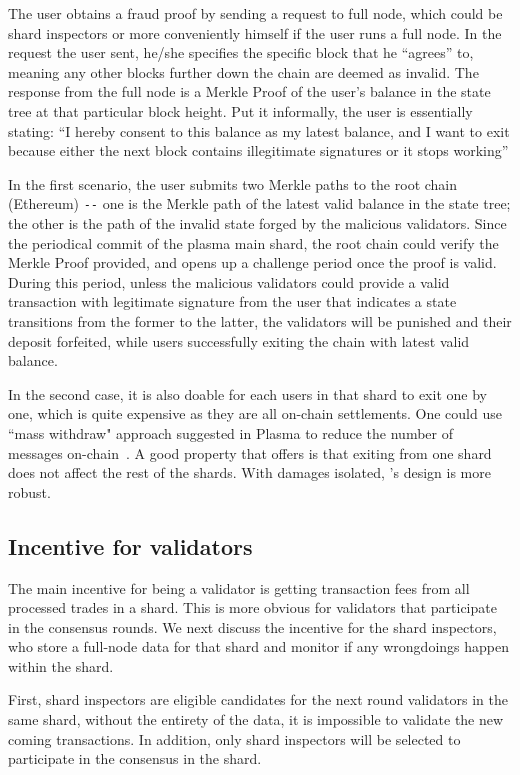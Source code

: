 The user obtains a fraud proof by sending a request to full node, which could be shard inspectors or more conveniently himself if the user runs a full node. In the request the user sent, he/she specifies the specific block that he “agrees” to, meaning any other blocks further down the chain are deemed as invalid. The response from the full node is a Merkle Proof of the user’s balance in the state tree at that particular block height. Put it informally, the user is essentially stating: “I hereby consent to this balance as my latest balance, and I want to exit because either the next block contains illegitimate signatures or it stops working”

In the first scenario, the user submits two Merkle paths to the root chain (Ethereum) \texttt{-{}-} one is the Merkle path of the latest valid balance in the state tree; the other is the path of the invalid state forged by the malicious validators. Since the periodical commit of the plasma main shard, the root chain could verify the Merkle Proof provided, and opens up a challenge period once the proof is valid. During this period, unless the malicious validators could provide a valid transaction with legitimate signature from the user that indicates a state transitions from the former to the latter, the validators will be punished and their deposit forfeited, while users successfully exiting the chain with latest valid balance.

In the second case, it is also doable for each users in that shard to exit one by one, which is quite expensive as they are all on-chain settlements. One could use ``mass withdraw" approach suggested in Plasma to reduce the number of messages on-chain~\cite{plasma}. A good property that \codename offers is that exiting from one shard does not affect the rest of the shards. With damages isolated, \codename's design is more robust.

\subsection{Incentive for validators}
The main incentive for being a validator is getting transaction fees from all processed trades in a shard. This is more obvious for validators that participate in the consensus rounds. We next discuss the incentive for the shard inspectors, who store a full-node data for that shard and monitor if any wrongdoings happen within the shard.

First, shard inspectors are eligible candidates for the next round validators in the same shard, without the entirety of the data, it is impossible to validate the new coming transactions. In addition, only shard inspectors will be selected to participate in the consensus in the shard.

